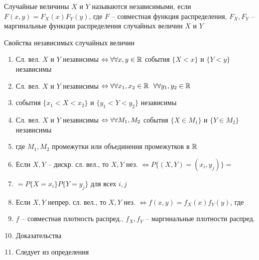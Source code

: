 
\OPR Случайные величины
$X$ и $Y$ называются независимыми, если $F(x,y) = F_X(x)F_Y(y)$, где $F$ -- совместная функция распределения, $F_X,F_Y$ -- маргинальные функции распределения случайных
величин $X$ и $Y$

Свойства независимых случайных величин
\begin{enumerate}[topsep=0pt, leftmargin=20pt, noitemsep, label=\arabic*\degree]
	\item Сл. вел. $X$ и $Y$ независимы $\Leftrightarrow\forall\forall x,y\in \mathbb{R}$ события $\{X < x\}$ и $\{Y < y\}$ независимы
	
	\item Сл. вел. $X$ и $Y$ независимы $\Leftrightarrow\forall\forall x_1,x_2\in \mathbb{R}~~\forall\forall y_1,y_2\in \mathbb{R}$ 
	\item [] события $\{x_1 < X < x_2\}$ и $\{y_1 < Y < y_2\}$ независимы
	
	\item Сл. вел. $X$ и $Y$ независимы $\Leftrightarrow\forall\forall M_1,M_2$ события $\{X\in M_1\}$ и $\{Y\in M_2\}$ независимы
	\item [] где $M_1,M_2$ промежутки или объединения промежутков в $\mathbb{R}$
	
	\item Если $X,Y$ -- дискр. сл. вел., то $X,Y$ нез. $\Leftrightarrow P\{(X,Y)=(x_i,y_j)\}=$
	\item [] $=P\{X=x_i\}P\{Y=y_j\}$ для всех $i,j$
	
	\item Если $X,Y$ непрер. сл. вел., то $X,Y$ нез. $\Leftrightarrow f(x,y)=f_X(x)f_Y(y)$, где
	\item [] $f$ -- совместная плотность распред., $f_X,f_Y$ -- маргинальные плотности распред.
	
	\item [] Доказательства
	\setcounter{enumi}{0}
	
	\item Следует из определения
	

\end{enumerate}
